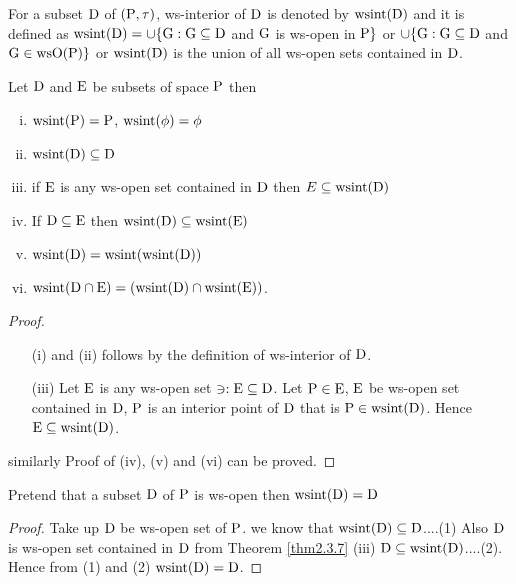 \begin{dfn}\label{defi2.4.3}
For a subset $\mathrm{D}$ of $(\mathrm{P},\tau)$, ws-interior of $\mathrm{D}$ is denoted by $\mathrm{wsint}(\mathrm{D})$ and it is defined as $\mathrm{wsint}(\mathrm{D})= \cup \{\mathrm{G}: \mathrm{G}\subseteq \mathrm{D}$ and $\mathrm{G}$ is ws-open in $\mathrm{P}\}$ or $\cup \{\mathrm{G}: \mathrm{G}\subseteq \mathrm{D}$ and $\mathrm{G} \in \mathrm{ws} \mathrm{O}(\mathrm{P})\}$ or $\mathrm{wsint}(\mathrm{D})$ is the union of all ws-open sets contained in $\mathrm{D}$.
\end{dfn}

\begin{thm}\label{thm2.4.4}
Let $\mathrm{D}$ and $\mathrm{E}$  be subsets of space $\mathrm{P}$ then
\begin{enumerate}[(i)]
\item $\mathrm{wsint} (\mathrm{P})=\mathrm{P}$, $\mathrm{wsint}(\phi)=\phi$
\item $\mathrm{wsint}(\mathrm{D})\subseteq \mathrm{D}$
\item if $\mathrm{E}$ is any ws-open set contained in $\mathrm{D}$ then $E\subseteq \mathrm{wsint}(\mathrm{D})$
\item If $\mathrm{D}\subseteq \mathrm{E}$ then $\mathrm{wsint}(\mathrm{D})\subseteq \mathrm{wsint}(\mathrm{E})$
\item $\mathrm{wsint}(\mathrm{D})=\mathrm{wsint}(\mathrm{wsint}(\mathrm{D}))$
\item $\mathrm{wsint}(\mathrm{D}\cap \mathrm{E})=(\mathrm{wsint}(\mathrm{D})\cap \mathrm{wsint}(\mathrm{E}))$.
\end{enumerate}
\end{thm}

\begin{proof}
\begin{itemize}
\item[(i)] and (ii) follows by the definition of ws-interior of $\mathrm{D}$.
\item[(iii)] Let $\mathrm{E}$ is any ws-open set $\ni: \mathrm{E}\subseteq \mathrm{D}$. Let $\mathrm{P}\in\mathrm{E}$, $\mathrm{E}$  be ws-open set contained in $\mathrm{D}$, $\mathrm{P}$ is an interior point of $\mathrm{D}$ that is $\mathrm{P}\in \mathrm{wsint}(\mathrm{D})$. Hence $\mathrm{E}\subseteq \mathrm{wsint}(\mathrm{D})$.
\end{itemize}
similarly Proof of (iv), (v) and (vi) can be proved.
\end{proof}

\begin{thm}\label{thm2.4.5}
Pretend that a subset $\mathrm{D}$ of $\mathrm{P}$ is ws-open then $\mathrm{wsint}(\mathrm{D})=\mathrm{D}$
\end{thm}

\begin{proof}
Take up $\mathrm{D}$ be ws-open set of $\mathrm{P}$. we know that $\mathrm{wsint}(\mathrm{D})\subseteq \mathrm{D}$....(1) Also $\mathrm{D}$ is ws-open set contained in $\mathrm{D}$ from Theorem \ref{thm2.3.7} (iii) $\mathrm{D}\subseteq \mathrm{wsint}(\mathrm{D})$....(2). Hence from (1) and (2) $\mathrm{wsint}(\mathrm{D})=\mathrm{D}$.
\end{proof}

